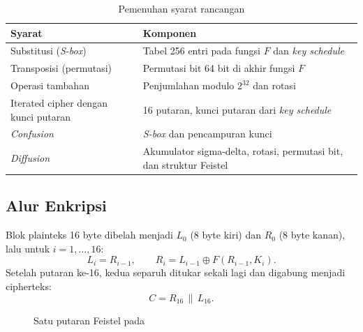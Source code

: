 \begin{table}[H]
  \centering
  \caption{Pemenuhan syarat rancangan}\label{tab:syarat}
  \begin{tabular}{p{5.5cm}p{9cm}}
    \toprule
    Syarat & Komponen \\
    \midrule
    Substitusi (\textit{S-box}) & Tabel 256 entri pada fungsi $F$ dan \textit{key schedule} \\
    Transposisi (permutasi) & Permutasi bit 64 bit di akhir fungsi $F$ \\
    Operasi tambahan & Penjumlahan modulo $2^{32}$ dan rotasi \\
    Iterated cipher dengan kunci putaran & 16 putaran, kunci putaran dari \textit{key schedule} \\
    \textit{Confusion} & \textit{S-box} dan pencampuran kunci \\
    \textit{Diffusion} & Akumulator sigma-delta, rotasi, permutasi bit, dan struktur Feistel \\
    \bottomrule
  \end{tabular}
\end{table}

\subsection{Alur Enkripsi}
Blok plainteks 16 byte dibelah menjadi $L_0$ (8 byte kiri) dan $R_0$ (8 byte kanan), lalu
untuk $i = 1, \dots, 16$:
\begin{equation}
  L_i = R_{i-1}, \qquad R_i = L_{i-1} \oplus F(R_{i-1}, K_i).
\end{equation}
Setelah putaran ke-16, kedua separuh ditukar sekali lagi dan digabung menjadi cipherteks:
\begin{equation}
  C = R_{16} \,\|\, L_{16}.
\end{equation}

\begin{figure}[H]
  \centering
  \caption{Satu putaran Feistel pada \algname{}}\label{fig:round}
\end{figure}

